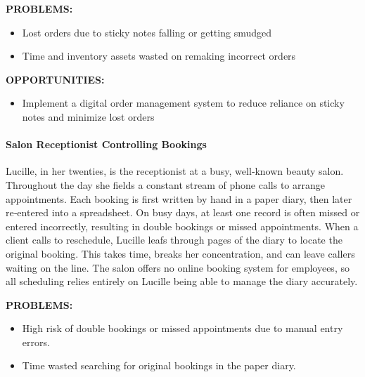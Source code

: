\documentclass[]{VUMIFTemplateClass}
\newcommand{\yellowcomment}[1]{%
    \begin{tcolorbox}[colback=yellow!80, colframe=yellow!80, arc=0pt, outer arc=0pt, boxrule=0pt, left=3pt, right=3pt, top=3pt, bottom=3pt]
        \textbf{\textcolor{red}{COMMENT:}} #1
    \end{tcolorbox}
}
\newcommand{\subsubsubsection}[1]{\paragraph{#1}}
\begin{document}

\textbf{PROBLEMS:}

\begin{itemize}
    \item Lost orders due to sticky notes falling or getting smudged
    \item Time and inventory assets wasted on remaking incorrect orders
\end{itemize}

\textbf{OPPORTUNITIES:}

\begin{itemize}
    \item Implement a digital order management system to reduce reliance on sticky notes and minimize lost orders
\end{itemize}



\subsubsubsection{Salon Receptionist Controlling Bookings}

Lucille, in her twenties, is the receptionist at a busy, well‑known beauty
salon. Throughout the day she fields a constant stream of phone calls to arrange
appointments. Each booking is first written by hand in a paper diary, then later
re‑entered into a spreadsheet. On busy days, at least one record is often missed
or entered incorrectly, resulting in double bookings or missed appointments.
When a client calls to reschedule, Lucille leafs through pages of the diary to
locate the original booking. This takes time, breaks her concentration, and can
leave callers waiting on the line. The salon offers no online booking system for employees,
so all scheduling relies entirely on Lucille being able to manage the diary
accurately.

\textbf{PROBLEMS:}

\begin{itemize}
    \item High risk of double bookings or missed appointments due to manual entry errors.
    \item Time wasted searching for original bookings in the paper diary.
\end{itemize}
\end{document}

